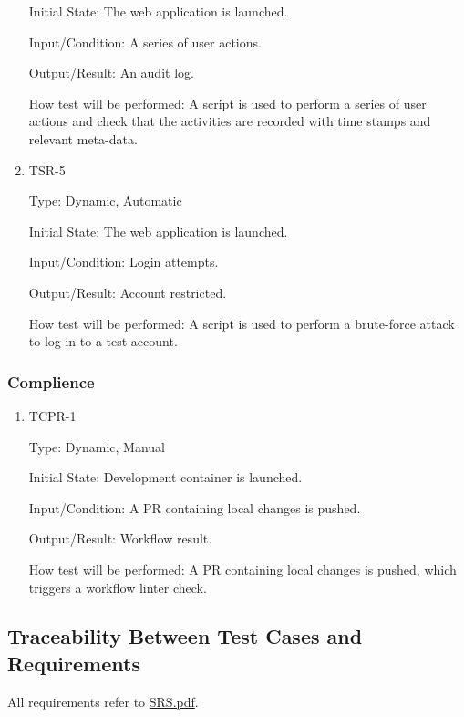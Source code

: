 \documentclass[12pt, titlepage]{article}
\begin{document}
\begin{enumerate}
Initial State: The web application is launched.
					
Input/Condition: A series of user actions.
					
Output/Result: An audit log.
					
How test will be performed: A script is used to perform a series of user actions and check that the activities are recorded with time stamps and relevant meta-data.

\item{TSR-5\\}\label{TSR-5}

Type: Dynamic, Automatic
					
Initial State: The web application is launched.
					
Input/Condition: Login attempts.
					
Output/Result: Account restricted.
					
How test will be performed: A script is used to perform a brute-force attack to log in to a test account.
\end{enumerate}

\subsubsection{Complience}

\begin{enumerate}
\item{TCPR-1\\}\label{TCPR-1}

Type: Dynamic, Manual
					
Initial State: Development container is launched.
					
Input/Condition: A PR containing local changes is pushed.
					
Output/Result: Workflow result.
					
How test will be performed: A PR containing local changes is pushed, which triggers a workflow linter check.
\end{enumerate}
\subsection{Traceability Between Test Cases and Requirements}
All requirements refer to \href{https://github.com/wangq131/4G06CapstoneProjectT5/blob/689841fefc298f80d84232996e1c7ca7981dd93d/docs/SRS/SRS.pdf}{SRS.pdf}.
\end{document}

